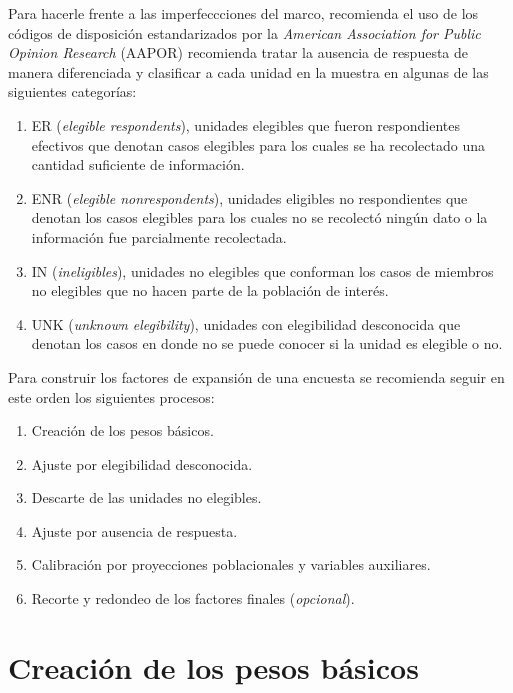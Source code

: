 \documentclass[
  12pt,
]{book}
\providecommand{\tightlist}{%
  \setlength{\itemsep}{0pt}\setlength{\parskip}{0pt}}
\begin{document}
Para hacerle frente a las imperfeccciones del marco, \citet{Valliant_Dever_2017} recomienda el uso de los códigos de disposición estandarizados por la \emph{American Association for Public Opinion Research} (AAPOR) recomienda tratar la ausencia de respuesta de manera diferenciada y clasificar a cada unidad en la muestra en algunas de las siguientes categorías:

\begin{enumerate}
\def\labelenumi{\arabic{enumi}.}
\tightlist
\item
  ER (\emph{elegible respondents}), unidades elegibles que fueron respondientes efectivos que denotan casos elegibles para los cuales se ha recolectado una cantidad suficiente de información.
\item
  ENR (\emph{elegible nonrespondents}), unidades eligibles no respondientes que denotan los casos elegibles para los cuales no se recolectó ningún dato o la información fue parcialmente recolectada.
\item
  IN (\emph{ineligibles}), unidades no elegibles que conforman los casos de miembros no elegibles que no hacen parte de la población de interés.
\item
  UNK (\emph{unknown elegibility}), unidades con elegibilidad desconocida que denotan los casos en donde no se puede conocer si la unidad es elegible o no.
\end{enumerate}

Para construir los factores de expansión de una encuesta se recomienda seguir en este orden los siguientes procesos:

\begin{enumerate}
\def\labelenumi{\arabic{enumi}.}
\tightlist
\item
  Creación de los pesos básicos.
\item
  Ajuste por elegibilidad desconocida.
\item
  Descarte de las unidades no elegibles.
\item
  Ajuste por ausencia de respuesta.
\item
  Calibración por proyecciones poblacionales y variables auxiliares.
\item
  Recorte y redondeo de los factores finales (\emph{opcional}).
\end{enumerate}

\hypertarget{creaciuxf3n-de-los-pesos-buxe1sicos}{%
\section{Creación de los pesos básicos}\label{creaciuxf3n-de-los-pesos-buxe1sicos}}
\end{document}
